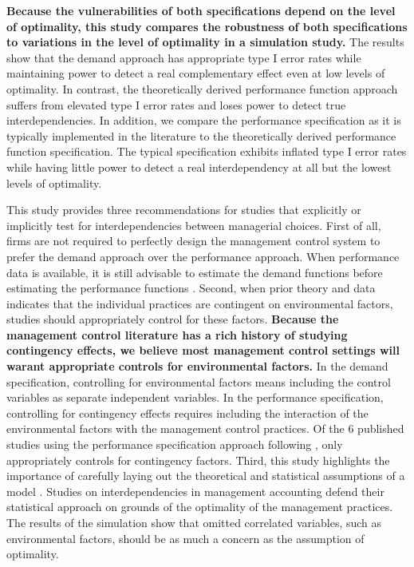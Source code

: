 \documentclass[12pt]{article}
\begin{document}
\textbf{Because the vulnerabilities of both specifications depend on the
level of optimality, this study compares the robustness of both
specifications to variations in the level of optimality in a simulation
study.} The results show that the demand approach has appropriate type I
error rates while maintaining power to detect a real complementary
effect even at low levels of optimality. In contrast, the theoretically
derived performance function approach suffers from elevated type I error
rates and loses power to detect true interdependencies. In addition, we
compare the performance specification as it is typically implemented in
the literature to the theoretically derived performance function
specification. The typical specification exhibits inflated type I error
rates while having little power to detect a real interdependency at all
but the lowest levels of optimality.

This study provides three recommendations for studies that explicitly or
implicitly test for interdependencies between managerial choices. First
of all, firms are not required to perfectly design the management
control system to prefer the demand approach over the performance
approach. When performance data is available, it is still advisable to
estimate the demand functions before estimating the performance
functions \citep{Aral2012, Cassiman2006}. Second, when prior theory and
data indicates that the individual practices are contingent on
environmental factors, studies should appropriately control for these
factors. \textbf{Because the management control literature has a rich
history of studying contingency effects, we believe most management
control settings will warant appropriate controls for environmental
factors.} In the demand specification, controlling for environmental
factors means including the control variables as separate independent
variables. In the performance specification, controlling for contingency
effects requires including the interaction of the environmental factors
with the management control practices. Of the 6 published studies using
the performance specification approach following \citet{Grabner2013},
only \citet{Bedford2016} appropriately controls for contingency factors.
Third, this study highlights the importance of carefully laying out the
theoretical and statistical assumptions of a model \citep{Chenhall2007}.
Studies on interdependencies in management accounting defend their
statistical approach on grounds of the optimality of the management
practices. The results of the simulation show that omitted correlated
variables, such as environmental factors, should be as much a concern as
the assumption of optimality.
\end{document}
